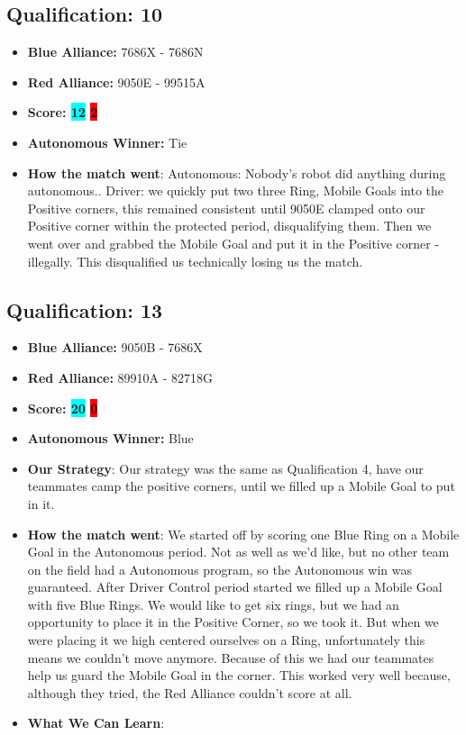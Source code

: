 \subsection*{Qualification: 10}

\begin{itemize}
    \item \textbf{Blue Alliance:} 7686X - 7686N
    \item \textbf{Red Alliance:} 9050E - 99515A
    \item \textbf{Score: \colorbox{cyan}{12}
    \colorbox{red}{2}}
    \item \textbf{Autonomous Winner:} Tie
    \item \textbf{How the match went}: Autonomous: Nobody's robot did anything during autonomous.. Driver: we quickly put two three Ring, Mobile Goals into the Positive corners, this remained consistent until 9050E clamped onto our Positive corner within the protected period, disqualifying them. Then we went over and grabbed the Mobile Goal and put it in the Positive corner - illegally. This disqualified us technically losing us the match.
\end{itemize}

\subsection*{Qualification: 13}

\begin{itemize}
    \item \textbf{Blue Alliance:} 9050B - 7686X
    \item \textbf{Red Alliance:} 89910A - 82718G
    \item \textbf{Score: \colorbox{cyan}{20} \colorbox{red}{0}}
    \item \textbf{Autonomous Winner:} Blue
    \item \textbf{Our Strategy}: Our strategy was the same as Qualification 4, have our teammates camp the positive corners, until we filled up a Mobile Goal to put in it.
    \item \textbf{How the match went}: We started off by scoring one Blue Ring on a Mobile Goal in the Autonomous period. Not as well as we'd like, but no other team on the field had a Autonomous program, so the Autonomous win was guaranteed. After Driver Control period started we filled up a Mobile Goal with five Blue Rings. We would like to get six rings, but we had an opportunity to place it in the Positive Corner, so we took it. But when we were placing it we high centered ourselves on a Ring, unfortunately this means we couldn't move anymore. Because of this we had our teammates help us guard the Mobile Goal in the corner. This worked very well because, although they tried, the Red Alliance couldn't score at all.
    \item \textbf{What We Can Learn}: 
\end{itemize}

